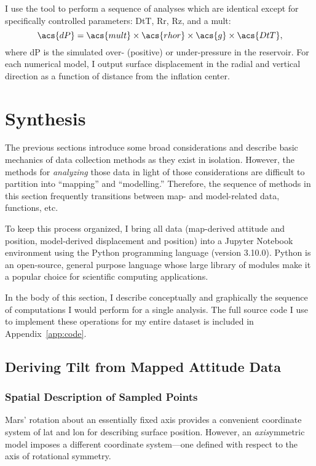 I use the  tool to perform a sequence of analyses which are identical except for specifically controlled parameters: \ac{DtT}, \ac{Rr}, \ac{Rz}, and a \ac{mult}:
\begin{equation}
    \acs{dP}=\acs{mult}\times\acs{rhor}\times\acs{g}\times\acs{DtT},
\end{equation}
where \acs{dP} is the simulated over- (positive) or under-pressure in the reservoir. For each numerical model, I output surface displacement in the radial and vertical direction as a function of distance from the inflation center. 

\section{Synthesis}

The previous sections introduce some broad considerations and describe basic mechanics of data collection methods as they exist in isolation. However, the methods for \emph{analyzing} those data in light of those considerations are difficult to partition into ``mapping'' and ``modelling.'' Therefore, the sequence of methods in this section frequently transitions between map- and model-related data, functions, etc.

To keep this process organized, I bring all data (map-derived attitude and position, model-derived displacement and position) into a Jupyter Notebook environment using the Python programming language (version 3.10.0). Python is an open-source, general purpose language whose large library of modules make it a popular choice for scientific computing applications.

In the body of this section, I describe conceptually and graphically the sequence of computations I would perform for a single analysis. The full source code I use to implement these operations for my entire dataset is included in Appendix~\ref{app:code}.

\subsection{Deriving Tilt from Mapped Attitude Data}

\subsubsection{Spatial Description of Sampled Points}

Mars' rotation about an essentially fixed axis provides a convenient coordinate system of \ac{lat} and \ac{lon} for describing surface position. However, an \emph{axis}ymmetric model imposes a different coordinate system---one defined with respect to the axis of rotational symmetry.

